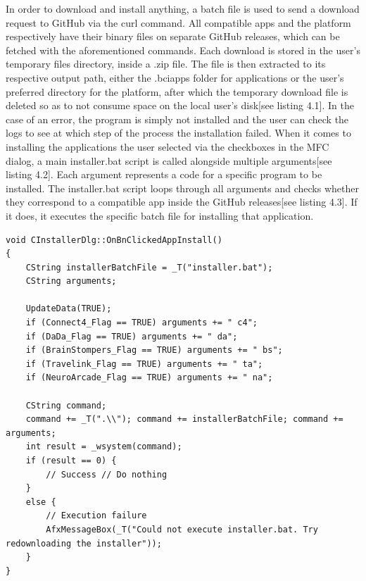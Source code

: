 In order to download and install anything, a batch file is used to send a download request to GitHub via the curl command. All compatible apps and the platform respectively have their binary files on separate GitHub releases, which can be fetched with the aforementioned commands. Each download is stored in the user's temporary files directory, inside a .zip file. The file is then extracted to its respective output path, either the .bciapps folder for applications or the user's preferred directory for the platform, after which the temporary download file is deleted so as to not consume space on the local user's disk[see listing 4.1]. In the case of an error, the program is simply not installed and the user can check the logs to see at which step of the process the installation failed.
\vspace{\baselineskip}\newline
When it comes to installing the applications the user selected via the checkboxes in the MFC dialog, a main installer.bat script is called alongside multiple arguments[see listing 4.2]. Each argument represents a code for a specific program to be installed. The installer.bat script loops through all arguments and checks whether they correspond to a compatible app inside the GitHub releases[see listing 4.3]. If it does, it executes the specific batch file for installing that application.

\begin{lstlisting}[language={[Sharp]C}, caption={Action Handler for the Install Apps button}, label={Script}]
void CInstallerDlg::OnBnClickedAppInstall()
{
	CString installerBatchFile = _T("installer.bat");
	CString arguments;

	UpdateData(TRUE);
	if (Connect4_Flag == TRUE) arguments += " c4";
	if (DaDa_Flag == TRUE) arguments += " da";
	if (BrainStompers_Flag == TRUE) arguments += " bs";
	if (Travelink_Flag == TRUE) arguments += " ta";
	if (NeuroArcade_Flag == TRUE) arguments += " na";

	CString command;
	command += _T(".\\"); command += installerBatchFile; command += arguments;
	int result = _wsystem(command);
	if (result == 0) {
		// Success // Do nothing
	}
	else {
		// Execution failure
		AfxMessageBox(_T("Could not execute installer.bat. Try redownloading the installer"));
	}
}
\end{lstlisting}

